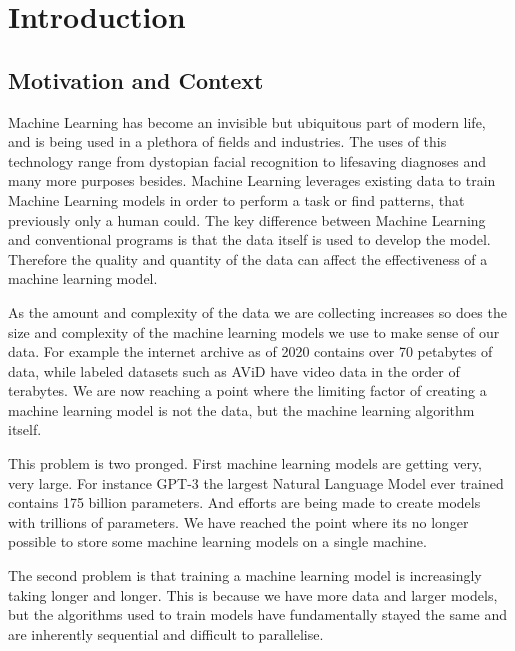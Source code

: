 
\section{Introduction}

\subsection{Motivation and Context}

Machine Learning has become an invisible but ubiquitous part of modern life, and
is being used in a plethora of fields and industries. The uses of this
technology range from dystopian facial recognition
\cite{mattBurgessFacialRecognision} to lifesaving diagnoses
\cite{Mammograms2020} and many more purposes besides. Machine Learning leverages
existing data to train Machine Learning models in order to perform a task or
find patterns, that previously only a human could. The key difference between
Machine Learning and conventional programs is that the data itself is used to
develop the model. Therefore the quality and quantity of the data can affect the
effectiveness of a machine learning model.
\par
As the amount and complexity of the data we are collecting increases so does the
size and complexity of the machine learning models we use to make sense of our
data. For example the internet archive as of 2020 contains over 70 petabytes of
data, while labeled datasets such as AViD have video data in the order of
terabytes. \cite{piergiovanni2020avid} We are now reaching a point where the
limiting factor of creating a machine learning model is not the data, but the
machine learning algorithm itself.
\par
This problem is two pronged. First machine learning models are getting very,
very large. For instance GPT-3 the largest Natural Language Model ever trained
contains 175 billion parameters. \cite{fewshowlearners2020gpt} And efforts are
being made to create models with trillions of parameters.
\cite{rajbhandari2020zero} We have reached the point where its no longer
possible to store some machine learning models on a single machine.
\par
The second problem is that training a machine learning model is increasingly
taking longer and longer. This is because we have more data and larger models,
but the algorithms used to train models have fundamentally stayed the same and
are inherently sequential and difficult to parallelise.





